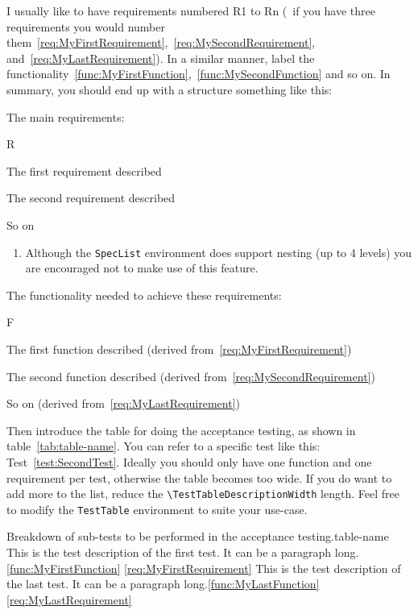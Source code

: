 I usually like to have requirements numbered R1 to Rn (\ie~if you have three requirements you would number them~\ref{req:MyFirstRequirement},~\ref{req:MySecondRequirement}, and~\ref{req:MyLastRequirement}). In a similar manner, label the functionality~\ref{func:MyFirstFunction},~\ref{func:MySecondFunction} and so on.
In summary, you should end up with a structure something like this:

The main requirements:

\begin{SpecList}{R}
  \item \label{req:MyFirstRequirement}  The first requirement described
  \item \label{req:MySecondRequirement} The second requirement described
  \item \label{req:MyLastRequirement}   So on
  \begin{enumerate}
    \item Although the \verb|SpecList| environment does support nesting (up to 4 levels) you are encouraged not to make use of this feature.
  \end{enumerate}
\end{SpecList}

The functionality needed to achieve these requirements:

\begin{SpecList}{F}
  \item \label{func:MyFirstFunction}  The first function described (derived from~\ref{req:MyFirstRequirement})
  \item \label{func:MySecondFunction} The second function described (derived from~\ref{req:MySecondRequirement})
  \item \label{func:MyLastFunction}   So on (derived from~\ref{req:MyLastRequirement})
\end{SpecList}

Then introduce the table for doing the acceptance testing, as shown in table~\ref{tab:table-name}.  You can refer to a specific test like this: Test~\ref{test:SecondTest}.  Ideally you should only have one function and one requirement per test, otherwise the table becomes too wide.  If you do want to add more to the list, reduce the \verb|\TestTableDescriptionWidth| length.  Feel free to modify the \verb|TestTable| environment to suite your use-case.

\begin{TestTable}{Breakdown of sub-tests to be performed in the acceptance testing.}{table-name}
   {This is the test description of the first test.   It can be a paragraph long.}{\ref{func:MyFirstFunction}} {\ref{req:MyFirstRequirement}}
    {This is the test description of the last test.    It can be a paragraph long.}{\ref{func:MyLastFunction}}  {\ref{req:MyLastRequirement}}
\end{TestTable}

